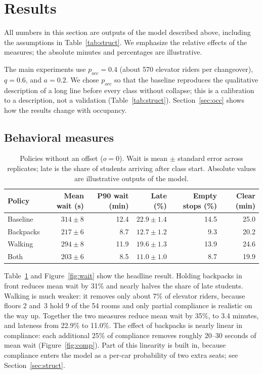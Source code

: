 \section{Results}

All numbers in this section are outputs of the model described above, including the assumptions in
Table~\ref{tab:struct}. We emphasize the relative effects of the measures; the absolute minutes and percentages are
illustrative.

The main experiments use $p_{occ}=0.4$ (about 570 elevator riders per changeover), $q=0.6$, and $a=0.2$.
We chose $p_{occ}$ so that the baseline reproduces the qualitative description of a long line before every
class without collapse; this is a calibration to a description, not a validation (Table~\ref{tab:struct}).
Section~\ref{sec:occ} shows how the results change with occupancy.

\subsection{Behavioral measures}

\begin{table}[h]
\centering
\caption{Policies without an offset ($o=0$). Wait is mean $\pm$ standard error across replicates; late is the
share of students arriving after class start. Absolute values are illustrative outputs of the model.}
\label{tab:policy}
\begin{tabular}{lrrrrr}
\toprule
Policy & Mean wait (s) & P90 wait (min) & Late (\%) & Empty stops (\%) & Clear (min)\\
\midrule
Baseline   & $314 \pm 8$ & 12.4 & $22.9 \pm 1.4$ & 14.5 & 25.0\\
Backpacks  & $217 \pm 6$ &  8.7 & $12.7 \pm 1.2$ &  9.3 & 20.2\\
Walking    & $294 \pm 8$ & 11.9 & $19.6 \pm 1.3$ & 13.9 & 24.6\\
Both       & $203 \pm 6$ &  8.5 & $11.0 \pm 1.0$ &  8.7 & 19.9\\
\bottomrule
\end{tabular}
\end{table}

Table~\ref{tab:policy} and Figure~\ref{fig:wait} show the headline result. Holding backpacks in front reduces
mean wait by 31\% and nearly halves the share of late students. Walking is much weaker: it removes only about
7\% of elevator riders, because floors 2 and~3 hold 9 of the 54 rooms and only partial compliance is
realistic on the way up. Together the two measures reduce mean wait by 35\%, to 3.4 minutes, and lateness
from 22.9\% to 11.0\%. The effect of backpacks is nearly linear in compliance: each additional 25\% of
compliance removes roughly 20--30 seconds of mean wait (Figure~\ref{fig:comp}). Part of this linearity is built in,
because compliance enters the model as a per-car probability of two extra seats; see Section~\ref{sec:struct}.

